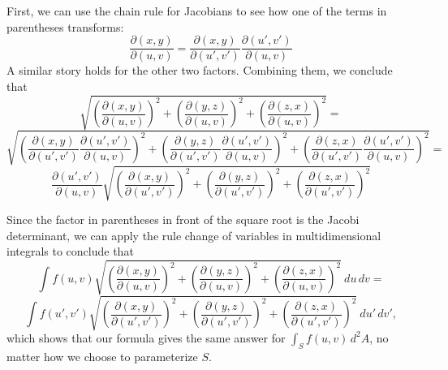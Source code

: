 \documentclass[12pt]{article}
\begin{document}
First, we can use the chain rule for Jacobians to see how one of the terms in parentheses transforms:
 $$\frac{\partial (x, y)}{\partial (u, v)} =  \frac{\partial (x, y)}{\partial (u', v')} \frac{\partial (u', v')}{\partial (u, v)}$$
 A similar story holds for the other two factors.  Combining them, we conclude that
 $$\sqrt{ \left(  \frac{\partial (x,y)}{\partial (u,v)} \right)^2 +  \left( \frac{\partial (y,z)}{\partial (u,v)} \right)^2 + \left( \frac{\partial (z,x)}{\partial (u,v)} \right)^2 } =$$
$$\sqrt{ \left(  \frac{\partial (x,y)}{\partial (u',v')} \frac{\partial (u', v')}{\partial (u, v)} \right)^2  +  \left( \frac{\partial (y,z)}{\partial (u',v')} \frac{\partial (u', v')}{\partial (u, v)} \right)^2 + \left( \frac{\partial (z,x)}{\partial (u',v')} \frac{\partial (u', v')}{\partial (u, v)} \right)^2 } =$$
 $$\frac{\partial (u', v')}{\partial (u, v)} \sqrt{ \left(  \frac{\partial (x,y)}{\partial (u',v')} \right)^2 +  \left( \frac{\partial (y,z)}{\partial (u',v')} \right)^2 + \left( \frac{\partial (z,x)}{\partial (u',v')} \right)^2 }$$

Since the factor in parentheses in front of the square root is the Jacobi determinant, we can apply the rule change of variables in multidimensional integrals to conclude that
 $$\int f(u,v) \sqrt{ \left(  \frac{\partial (x,y)}{\partial (u,v)} \right)^2 +  \left( \frac{\partial (y,z)}{\partial (u,v)} \right)^2 + \left( \frac{\partial (z,x)}{\partial (u,v)} \right)^2 } \> du \, dv = $$
 $$\int f(u',v') \sqrt{ \left(  \frac{\partial (x,y)}{\partial (u',v')} \right)^2 +  \left( \frac{\partial (y,z)}{\partial (u',v')} \right)^2 + \left( \frac{\partial (z,x)}{\partial (u',v')} \right)^2 } \> du' \, dv',$$
which shows that our formula gives the same answer for $\int_S f(u,v) \, d^2 A$, no matter how we choose to parameterize $S$.
\end{document}
